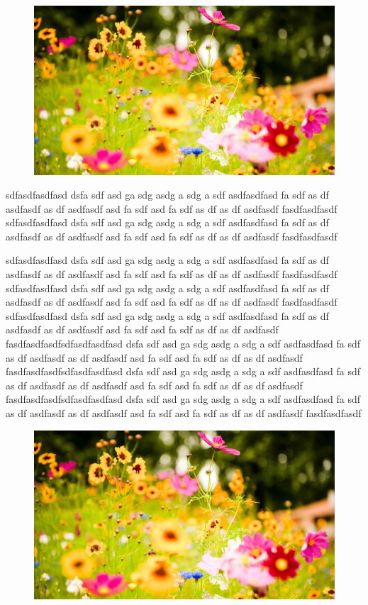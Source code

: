 \documentclass[12pt,a4paper]{article}
\begin{document}
\begin{multicols}{3}
  \begin{figure}[H]
\includegraphics[scale=0.1]{../../External/Images/flowers}
\end{figure}
  

sdfasdfasdfasd dsfa sdf asd ga sdg asdg a sdg a sdf asdfasdfasd fa sdf as df asdfasdf as df asdfasdf asd fa sdf asd fa sdf as df as df asdfasdf
fasdfasdfasdf
sdfasdfasdfasd dsfa sdf asd ga sdg asdg a sdg a sdf asdfasdfasd fa sdf as df asdfasdf as df asdfasdf asd fa sdf asd fa sdf as df as df asdfasdf
fasdfasdfasdf

sdfasdfasdfasd dsfa sdf asd ga sdg asdg a sdg a sdf asdfasdfasd fa sdf as df asdfasdf as df asdfasdf asd fa sdf asd fa sdf as df as df asdfasdf
fasdfasdfasdf
sdfasdfasdfasd dsfa sdf asd ga sdg asdg a sdg a sdf asdfasdfasd fa sdf as df asdfasdf as df asdfasdf asd fa sdf asd fa sdf as df as df asdfasdf
fasdfasdfasdf
sdfasdfasdfasd dsfa sdf asd ga sdg asdg a sdg a sdf asdfasdfasd fa sdf as df asdfasdf as df asdfasdf asd fa sdf asd fa sdf as df as df asdfasdf
fasdfasdfasdfsdfasdfasdfasd dsfa sdf asd ga sdg asdg a sdg a sdf asdfasdfasd fa sdf as df asdfasdf as df asdfasdf asd fa sdf asd fa sdf as df as df asdfasdf
fasdfasdfasdfsdfasdfasdfasd dsfa sdf asd ga sdg asdg a sdg a sdf asdfasdfasd fa sdf as df asdfasdf as df asdfasdf asd fa sdf asd fa sdf as df as df asdfasdf
fasdfasdfasdfsdfasdfasdfasd dsfa sdf asd ga sdg asdg a sdg a sdf asdfasdfasd fa sdf as df asdfasdf as df asdfasdf asd fa sdf asd fa sdf as df as df asdfasdf
fasdfasdfasdf

  \begin{figure}[H]
\includegraphics[scale=0.1]{../../External/Images/flowers}
\end{figure}
  


\end{multicols}
\end{document}
